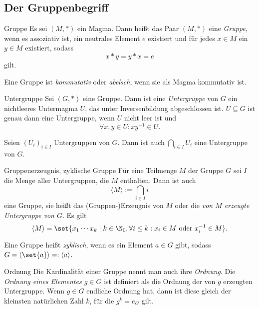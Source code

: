 \subsection{Der Gruppenbegriff}

\begin{karte}{Gruppe}
    Es sei \((M,*)\) ein Magma. Dann heißt das Paar \((M,*)\) 
    eine \textit{Gruppe}, wenn es assoziativ ist, ein neutrales 
    Element \(e\) existiert und für jedes \(x\in M\) ein 
    \(y\in M\) existiert, sodass 
    \[ x*y=y*x=e \]
    gilt.

    Eine Gruppe ist \textit{kommutativ} oder \textit{abelsch}, 
    wenn sie als Magma kommutativ ist.
\end{karte}

\begin{karte}{Untergruppe}
    Sei \((G,*)\) eine Gruppe. Dann ist eine \textit{Untergruppe} von 
    \(G\) ein nichtleeres Untermagma \(U\), das unter Inversenbildung 
    abgeschlossen ist. \(U\subseteq G\) ist genau dann eine 
    Untergruppe, wenn \(U\) nicht leer ist und 
    \[ \forall x,y\in U: x y^{-1}\in U. \]

    Seien \((U_i)_{i\in I}\) Untergruppen von \(G\). Dann ist auch \(\bigcap_{i\in I} U_i\) 
    eine Untergruppe von \(G\).
\end{karte}

\begin{karte}{Gruppenerzeugnis, zyklische Gruppe}
    Für eine Teilmenge \(M\) der Gruppe \(G\) sei \(I\) die 
    Menge aller Untergruppen, die \(M\) enthalten. Dann ist auch 
    \[ \langle M \rangle := \bigcap_{i\in I} i \]
    eine Gruppe, sie heißt das (Gruppen-)Erzeugnis von \(M\) 
    oder die \textit{von \(M\) erzeugte Untergruppe von \(G\)}.
    Es gilt 
    \[ \langle M \rangle = \set{ x_1 \cdots x_k 
    \;|\; k\in \N_0, \forall i\leq k: x_i \in M \text{ oder } x_i^{-1} \in M }. \]

    Eine Gruppe heißt \textit{zyklisch}, wenn es ein Element \(a\in G\) 
    gibt, sodass \(G = \langle \set{a} \rangle =: \langle a \rangle\). 
\end{karte}

\begin{karte}{Ordnung}
    Die Kardinalität einer Gruppe nennt man auch ihre \textit{Ordnung}. 
    Die \textit{Ordnung eines Elementes \(g\in G\)} ist definiert als die Ordnung der von 
    \(g\) erzeugten Untergruppe.
    Wenn \(g\in G\) endliche Ordnung hat, dann ist diese gleich 
    der kleinsten natürlichen Zahl \(k\), für die \(g^k = e_G\) gilt.
\end{karte}

